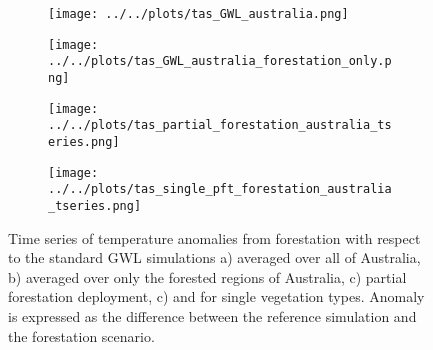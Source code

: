 \documentclass[]{article}
\begin{document}
\begin{figure}[H]
    \centering
    \begin{subfigure}[b]{0.4\linewidth}
        \texttt{[image: ../../plots/tas\_GWL\_australia.png]}
    \end{subfigure}
    \begin{subfigure}[b]{0.4\linewidth}
        \texttt{[image: ../../plots/tas\_GWL\_australia\_forestation\_only.png]}
    \end{subfigure}
    \begin{subfigure}[b]{0.4\linewidth}
        \texttt{[image: ../../plots/tas\_partial\_forestation\_australia\_tseries.png]}
    \end{subfigure}
    \begin{subfigure}[b]{0.4\linewidth}
        \texttt{[image: ../../plots/tas\_single\_pft\_forestation\_australia\_tseries.png]}
    \end{subfigure}
    \caption{
    Time series of temperature anomalies from forestation with respect to the standard GWL simulations a) averaged over all of Australia, b) averaged over only the forested regions of Australia, c) partial forestation deployment, c)
and for single vegetation types. Anomaly is expressed as the difference between the reference simulation and the forestation scenario.}
    \label{fig:tas_australia_timeseries}
\end{figure}

%
\end{document}

